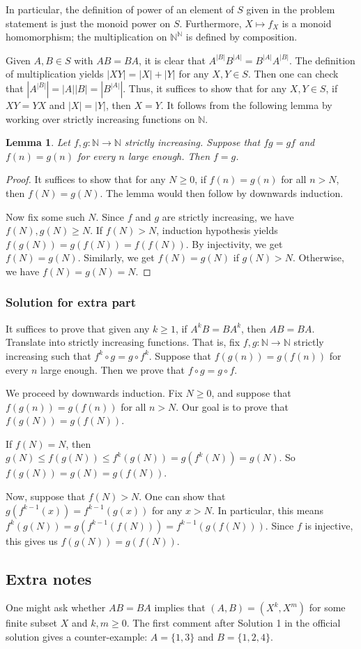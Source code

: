 \documentclass{article}
\newcommand{\N}{\mathbb{N}}
\newtheorem{lemma}{Lemma}
\begin{document}
In particular, the definition of power of an element of $S$ given in the problem statement is just the monoid power on $S$.
Furthermore, $X \mapsto f_X$ is a monoid homomorphism; the multiplication on $\N^\N$ is defined by composition.

Given $A, B \in S$ with $AB = BA$, it is clear that $A^{|B|} B^{|A|} = B^{|A|} A^{|B|}$.
The definition of multiplication yields $|XY| = |X| + |Y|$ for any $X, Y \in S$.
Then one can check that $|A^{|B|}| = |A||B| = |B^{|A|}|$.
Thus, it suffices to show that for any $X, Y \in S$, if $XY = YX$ and $|X| = |Y|$, then $X = Y$.
It follows from the following lemma by working over strictly increasing functions on $\N$.

\begin{lemma}\label{2017c7-2}
Let $f, g : \N \to \N$ strictly increasing.
Suppose that $fg = gf$ and $f(n) = g(n)$ for every $n$ large enough.
Then $f = g$.
\end{lemma}
\begin{proof}
It suffices to show that for any $N \geq 0$, if $f(n) = g(n)$ for all $n > N$, then $f(N) = g(N)$.
The lemma would then follow by downwards induction.

Now fix some such $N$.
Since $f$ and $g$ are strictly increasing, we have $f(N), g(N) \geq N$.
If $f(N) > N$, induction hypothesis yields $f(g(N)) = g(f(N)) = f(f(N))$.
By injectivity, we get $f(N) = g(N)$.
Similarly, we get $f(N) = g(N)$ if $g(N) > N$.
Otherwise, we have $f(N) = g(N) = N$.
\end{proof}



\subsubsection*{Solution for extra part}

It suffices to prove that given any $k \geq 1$, if $A^k B = B A^k$, then $AB = BA$.
Translate into strictly increasing functions.
That is, fix $f, g : \N \to \N$ strictly increasing such that $f^k \circ g = g \circ f^k$.
Suppose that $f(g(n)) = g(f(n))$ for every $n$ large enough.
Then we prove that $f \circ g = g \circ f$.

We proceed by downwards induction.
Fix $N \geq 0$, and suppose that $f(g(n)) = g(f(n))$ for all $n > N$.
Our goal is to prove that $f(g(N)) = g(f(N))$.

If $f(N) = N$, then $g(N) \leq f(g(N)) \leq f^k(g(N)) = g(f^k(N)) = g(N)$.
So $f(g(N)) = g(N) = g(f(N))$.

Now, suppose that $f(N) > N$.
One can show that $g(f^{k - 1}(x)) = f^{k - 1}(g(x))$ for any $x > N$.
In particular, this means $f^k(g(N)) = g(f^{k - 1}(f(N))) = f^{k - 1}(g(f(N)))$.
Since $f$ is injective, this gives us $f(g(N)) = g(f(N))$.




\subsection*{Extra notes}

One might ask whether $AB = BA$ implies that $(A, B) = (X^k, X^m)$ for some finite subset $X$ and $k, m \geq 0$.
The first comment after Solution 1 in the official solution gives a counter-example: $A = \{1, 3\}$ and $B = \{1, 2, 4\}$.
\end{document}
